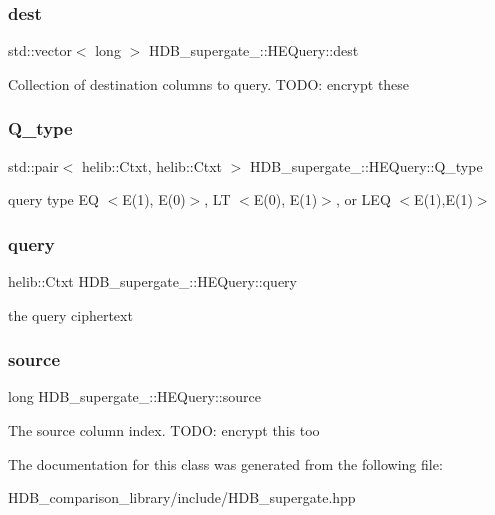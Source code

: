 \subsubsection{\texorpdfstring{dest}{dest}}
{\footnotesize\ttfamily std\+::vector$<$ long $>$ H\+D\+B\+\_\+supergate\+\_\+\+::\+H\+E\+Query\+::dest}

Collection of destination columns to query. T\+O\+DO\+: encrypt these \mbox{\label{classHDB__supergate___1_1HEQuery_a21c317527c7f5873d4ca2880c944611d}} 
\subsubsection{\texorpdfstring{Q\+\_\+type}{Q\_type}}
{\footnotesize\ttfamily std\+::pair$<$ helib\+::\+Ctxt, helib\+::\+Ctxt $>$ H\+D\+B\+\_\+supergate\+\_\+\+::\+H\+E\+Query\+::\+Q\+\_\+type}

query type EQ $<$E(1), E(0)$>$, LT $<$E(0), E(1)$>$, or L\+EQ $<$E(1),E(1)$>$ \mbox{\label{classHDB__supergate___1_1HEQuery_a4f6c52dc14ce033598e3ee9a7411fa75}} 
\subsubsection{\texorpdfstring{query}{query}}
{\footnotesize\ttfamily helib\+::\+Ctxt H\+D\+B\+\_\+supergate\+\_\+\+::\+H\+E\+Query\+::query}

the query ciphertext \mbox{\label{classHDB__supergate___1_1HEQuery_aebda8c020d4bd15f7da4128a7b5028bc}} 
\subsubsection{\texorpdfstring{source}{source}}
{\footnotesize\ttfamily long H\+D\+B\+\_\+supergate\+\_\+\+::\+H\+E\+Query\+::source}

The source column index. T\+O\+DO\+: encrypt this too 

The documentation for this class was generated from the following file\+:\begin{DoxyCompactItemize}
\item 
H\+D\+B\+\_\+comparison\+\_\+library/include/H\+D\+B\+\_\+supergate.\+hpp\end{DoxyCompactItemize}

